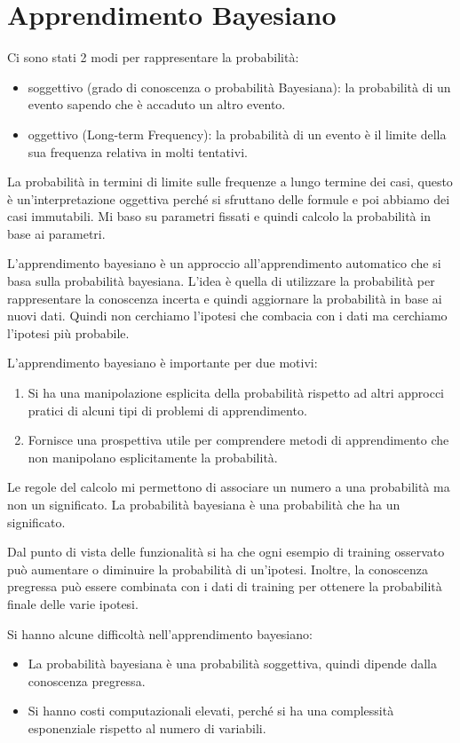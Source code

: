 \chapter{Apprendimento Bayesiano}
Ci sono stati 2 modi per rappresentare la probabilità:
\begin{itemize}
    \item soggettivo (grado di conoscenza o probabilità Bayesiana): la probabilità di un evento sapendo che è accaduto un altro evento.
    \item oggettivo (Long-term Frequency): la probabilità di un evento è il limite della sua frequenza relativa in molti tentativi.
\end{itemize}
La probabilità in termini di limite sulle frequenze a lungo termine dei casi, questo è un'interpretazione oggettiva perché si sfruttano delle formule e poi abbiamo dei casi immutabili. Mi baso su parametri fissati e quindi calcolo la probabilità in base ai parametri.

L'apprendimento bayesiano è un approccio all'apprendimento automatico che si basa sulla probabilità bayesiana. L'idea è quella di utilizzare la probabilità per rappresentare la conoscenza incerta e quindi aggiornare la probabilità in base ai nuovi dati. Quindi non cerchiamo l'ipotesi che combacia con i dati ma cerchiamo l'ipotesi più probabile.

L'apprendimento bayesiano è importante per due motivi:
\begin{enumerate}
    \item Si ha una manipolazione esplicita della probabilità rispetto ad altri approcci pratici di alcuni tipi di problemi di apprendimento.
    \item Fornisce una prospettiva utile per comprendere metodi di apprendimento che non manipolano esplicitamente la probabilità.
\end{enumerate}

Le regole del calcolo mi permettono di associare un numero a una probabilità ma non un significato. La probabilità bayesiana è una probabilità che ha un significato.

Dal punto di vista delle funzionalità si ha che ogni esempio di training osservato può aumentare o diminuire la probabilità di un'ipotesi. Inoltre, la conoscenza pregressa può essere combinata con i dati di training per ottenere la probabilità finale delle varie ipotesi.

Si hanno alcune difficoltà nell'apprendimento bayesiano:
\begin{itemize}
    \item La probabilità bayesiana è una probabilità soggettiva, quindi dipende dalla conoscenza pregressa.
    \item Si hanno costi computazionali elevati, perché si ha una complessità esponenziale rispetto al numero di variabili.
\end{itemize}

